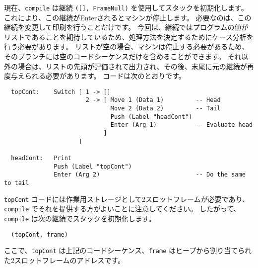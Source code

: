 \documentclass{jarticle}
\begin{document}
現在、\texttt{compile} は継続 \texttt{([], FrameNull)} を使用してスタックを初期化します。
これにより、この継続がEnterされるとマシンが停止します。
必要なのは、この継続を変更して印刷を行うことだけです。
今回は、継続ではプログラムの値がリストであることを期待しているため、処理方法を決定するためにケース分析を行う必要があります。
リストが空の場合、マシンは停止する必要があるため、そのブランチには空のコードシーケンスだけを含めることができます。
それ以外の場合は、リストの先頭が評価されて出力され、その後、末尾に元の継続が再度与えられる必要があります。
コードは次のとおりです。

\begin{verbatim}
  topCont:    Switch [ 1 -> []
                       2 -> [ Move 1 (Data 1)         -- Head
                              Move 2 (Data 2)         -- Tail
                              Push (Label "headCont")
                              Enter (Arg 1)           -- Evaluate head
                            ]
                     ]

  headCont:   Print
              Push (Label "topCont")
              Enter (Arg 2)                           -- Do the same to tail
\end{verbatim}

\texttt{topCont} コードには作業用ストレージとして2スロットフレームが必要であり、\texttt{compile} でそれを提供する方がよいことに注意してください。
したがって、\texttt{compile} は次の継続でスタックを初期化します。

\begin{verbatim}
  (topCont, frame)
\end{verbatim}

ここで、\texttt{topCont} は上記のコードシーケンス、\texttt{frame} はヒープから割り当てられた2スロットフレームのアドレスです。
\end{document}
